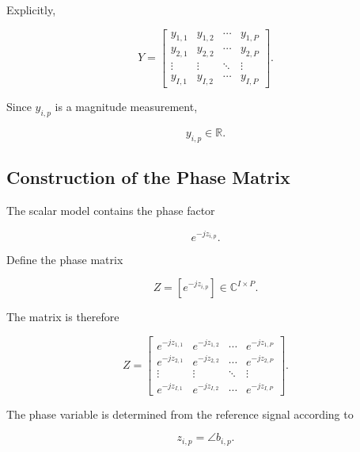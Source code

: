 \documentclass[12pt,a4paper]{article}
\begin{document}
Explicitly,

\begin{equation}
Y=
\begin{bmatrix}
y_{1,1} & y_{1,2} & \cdots & y_{1,P}\\
y_{2,1} & y_{2,2} & \cdots & y_{2,P}\\
\vdots & \vdots & \ddots & \vdots\\
y_{I,1} & y_{I,2} & \cdots & y_{I,P}
\end{bmatrix}.
\tag{137}
\end{equation}

Since $y_{i,p}$ is a magnitude measurement,

\begin{equation}
y_{i,p}\in\mathbb{R}.
\tag{138}
\end{equation}

\subsection{Construction of the Phase Matrix}

The scalar model contains the phase factor

\begin{equation}
e^{-jz_{i,p}}.
\tag{139}
\end{equation}

Define the phase matrix

\begin{equation}
\boxed{
Z=
[e^{-jz_{i,p}}]
\in
\mathbb{C}^{I\times P}
}.
\tag{140}
\end{equation}

The matrix is therefore

\begin{equation}
Z=
\begin{bmatrix}
e^{-jz_{1,1}} & e^{-jz_{1,2}} & \cdots & e^{-jz_{1,P}}\\
e^{-jz_{2,1}} & e^{-jz_{2,2}} & \cdots & e^{-jz_{2,P}}\\
\vdots & \vdots & \ddots & \vdots\\
e^{-jz_{I,1}} & e^{-jz_{I,2}} & \cdots & e^{-jz_{I,P}}
\end{bmatrix}.
\tag{141}
\end{equation}

The phase variable is determined from the reference signal according to

\begin{equation}
z_{i,p}
=
\angle b_{i,p}.
\tag{142}
\end{equation}
\end{document}
